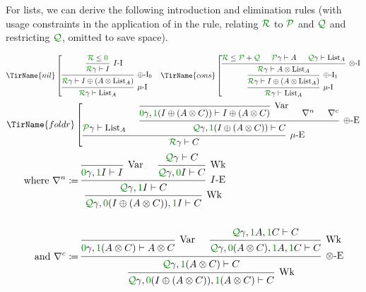 \begin{example}\label{thm:list-rules}
  For lists, we can derive the following introduction and elimination rules
  (with usage constraints in the application of  in the
   rule, relating $\grR$ to $\grP$ and $\grQ$ and restricting
  $\grQ$, omitted to save space).

  \begin{align*}
    \TirName{nil}\left[
    \begin{prooftree}
      \hypo{\grR \leq \gr0}
      \infer1[$I$-I]{\grR\gamma \vdash I}
      \infer1[$\oplus$-I$_0$]%
      {\grR\gamma \vdash I \oplus \plr{A \otimes \mathrm{List}_A}}
      \infer1[$\mu$-I]{\grR\gamma \vdash \mathrm{List}_A}
    \end{prooftree}
    \right.
    &&
    \TirName{cons}\left[
    \begin{prooftree}
      \hypo{\grR \leq \grP + \grQ}
      \hypo{\grP\gamma \vdash A}
      \hypo{\grQ\gamma \vdash \mathrm{List}_A}
      \infer3[$\otimes$-I]{\grR\gamma \vdash A \otimes \mathrm{List}_A}
      \infer1[$\oplus$-I$_1$]%
      {\grR\gamma \vdash I \oplus \plr{A \otimes \mathrm{List}_A}}
      \infer1[$\mu$-I]{\grR\gamma \vdash \mathrm{List}_A}
    \end{prooftree}
    \right.
  \end{align*}
  \begin{displaymath}
    \TirName{foldr}\left[
    \begin{prooftree}
      \hypo{\grP\gamma \vdash \mathrm{List}_A}
      \infer0[Var]{\gr0\gamma, \gr1\plr{I \oplus \plr{A \otimes C}}
        \vdash I \oplus \plr{A \otimes C}}
      \hypo{\nabla^n}
      \hypo{\nabla^c}
      \infer3[$\oplus$-E]{\grQ\gamma, \gr1\plr{I \oplus \plr{A \otimes C}}
        \vdash C}
      \infer2[$\mu$-E]{\grR\gamma \vdash C}
    \end{prooftree}
    \right.
  \end{displaymath}
  \begin{align*}
    \textrm{where }\nabla^n &\coloneqq
    \begin{prooftree}
      \infer0[Var]{\gr0\gamma, \gr1I \vdash I}
      \hypo{\grQ\gamma \vdash C}
      \infer1[Wk]{\grQ\gamma, \gr0I \vdash C}
      \infer2[$I$-E]{\grQ\gamma, \gr1I \vdash C}
      \infer1[Wk]{\grQ\gamma, \gr0\plr{I \oplus \plr{A \otimes C}}, \gr1I
        \vdash C}
    \end{prooftree}
    \\\\
    \textrm{and }\nabla^c &\coloneqq
    \begin{prooftree}
      \infer0[Var]{\gr0\gamma, \gr1\plr{A \otimes C} \vdash A \otimes C}
      \hypo{\grQ\gamma, \gr1A, \gr1C \vdash C}
      \infer1[Wk]{\grQ\gamma, \gr0\plr{A \otimes C}, \gr1A, \gr1C \vdash C}
      \infer2[$\otimes$-E]{\grQ\gamma, \gr1\plr{A \otimes C} \vdash C}
      \infer1[Wk]%
      {\grQ\gamma, \gr0\plr{I \oplus \plr{A \otimes C}}, \gr1\plr{A \otimes C}
        \vdash C}
    \end{prooftree}
  \end{align*}


\end{example}
